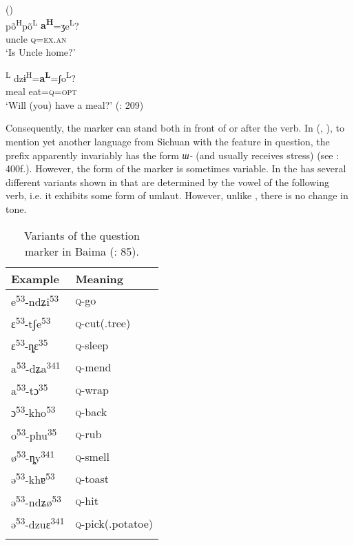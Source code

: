 \ea%
    \label{ex:trans:48}
     ()\\
    \ea
    \gll põ\textsuperscript{H}{põ}\textsuperscript{L} \textbf{{a}}\textbf{\textsuperscript{H}}{=ʒe}\textsuperscript{L}?\\
    uncle     \textsc{q=}\textsc{ex.an}\\
    \glt ‘Is Uncle home?’
    
    \ex
    \textsuperscript{L} {dzɨ}\textsuperscript{H}{=}\textbf{{a}}\textbf{\textsuperscript{L}}{=ʃo}\textsuperscript{L}?\\
    meal  eat=\textsc{q}=\textsc{opt}\\
    \glt ‘Will (you) have a meal?’ (\citealt{Ding2014}: 209)
    \z
    \z

\noindent Consequently, the marker can stand both in front of or after the verb. In  (, ), to mention yet another language from Sichuan with the feature in question, the prefix apparently invariably has the form \textit{ɯ-} (and usually receives stress) (see \citealt{Jacques2004}: 400f.). However, the form of the marker is sometimes variable. In  the  has several different variants shown in  that are determined by the vowel of the following verb, i.e. it exhibits some form of umlaut. However, unlike , there is no change in tone.

\begin{table}
\caption{Variants of the question marker in Baima (\citealt{Sun1996}: 85).}
\label{tab:trans:2}

\begin{tabularx}{.8\textwidth}{XX}
\lsptoprule

\textbf{Example} & \textbf{Meaning}\\
\midrule
e\textsuperscript{53}-ndʑi\textsuperscript{53} & \textsc{q}-go\\
ɛ\textsuperscript{53}-tʃe\textsuperscript{53} & \textsc{q}-cut(.tree)\\
ɛ\textsuperscript{53}-ȵɛ\textsuperscript{35} & \textsc{q}-sleep\\
a\textsuperscript{53}-dʑa\textsuperscript{341} & \textsc{q}-mend\\
a\textsuperscript{53}-tɔ\textsuperscript{35} & \textsc{q}-wrap\\
ɔ\textsuperscript{53}-kho\textsuperscript{53} & \textsc{q}-back\\
o\textsuperscript{53}-phu\textsuperscript{35} & \textsc{q}-rub\\
ø\textsuperscript{53}-ȵy\textsuperscript{341} & \textsc{q}-smell\\
ə\textsuperscript{53}-khɐ\textsuperscript{53} & \textsc{q}-toast\\
ə\textsuperscript{53}-ndʑø\textsuperscript{53} & \textsc{q}-hit\\
ə\textsuperscript{53}-dzuɛ\textsuperscript{341} & \textsc{q}-pick(.potatoe)\\
\lspbottomrule
\end{tabularx}
\end{table}

